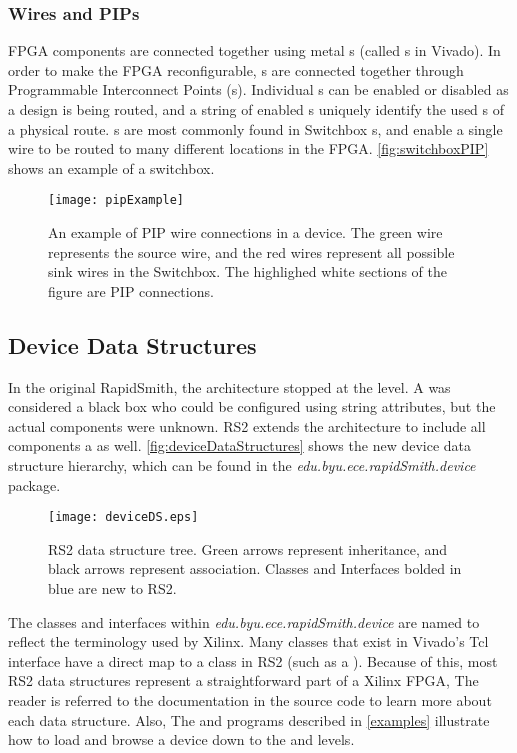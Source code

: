 \subsubsection{Wires and PIPs} \label{wireSection}
 
FPGA components are connected together using metal s (called
s in Vivado). In order to make the FPGA reconfigurable,
s are connected together through Programmable Interconnect Points
(s). Individual s can be enabled or disabled as a design is
being routed, and a string of enabled s uniquely identify the
used s of a physical route. s are most commonly
found in Switchbox s, and enable a single wire to be routed to many
different locations in the FPGA. \autoref{fig:switchboxPIP} shows an
example of a switchbox.

\begin{figure}[H]
	\centering
	\texttt{[image: pipExample]}
	\caption{An example of PIP wire connections in a device. The green wire
	represents the source wire, and the red wires represent all possible sink
	wires in the Switchbox. The highlighed white sections of the figure are PIP
	connections.}
	\label{fig:switchboxPIP}
\end{figure} 
 
\subsection{Device Data Structures} \label{devicesRS2}
In the original RapidSmith, the  architecture stopped at the
 level. A  was considered a black box who could be
configured using string attributes, but the actual components were unknown.
RS2 extends the  architecture to include all components
 a  as well. \autoref{fig:deviceDataStructures}
shows the new device data structure hierarchy, which can be found in the {\em
edu.byu.ece.rapidSmith.device} package.

\begin{figure}[H]
	\centering
	\texttt{[image: deviceDS.eps]}
	\caption{RS2  data structure tree. Green arrows represent
	inheritance, and black arrows represent association. Classes and Interfaces
	bolded in blue are new to RS2.}
	\label{fig:deviceDataStructures}
\end{figure}

\noindent
The classes and interfaces within {\em edu.byu.ece.rapidSmith.device} are named
to reflect the terminology used by Xilinx. Many classes that exist in Vivado's
Tcl interface have a direct map to a class in RS2 (such as a ).
Because of this, most RS2 data structures represent a straightforward
part of a Xilinx FPGA, The reader is referred to the documentation in the
source code to learn more about each data structure. Also, The
 and  programs described in 
\autoref{examples} illustrate how to load and browse a device down to the
 and  levels.

